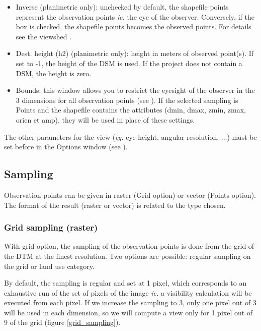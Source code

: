 \documentclass{report}
\begin{document}
\begin{itemize}
	\item Inverse (planimetric only): unchecked by default, the shapefile points represent the observation points \textit{ie.} the eye of the observer. Conversely, if the box is checked, the shapefile points becomes the observed points. For details see the viewshed .
	\item Dest. height (h2) (planimetric only): height in meters of observed point(s). If set to -1, the height of the DSM is used. If the project does not contain a DSM, the height is zero.
	\item Bounds: this window allows you to restrict the eyesight of the observer in the 3 dimensions for all observation points (see ). If the selected sampling is Points and the shapefile contains the attributes (dmin, dmax, zmin, zmax, orien et amp), they will be used in place of these settings.	
\end{itemize}

The other parameters for the view (\textit {eg.} eye height, angular resolution, ...) must be set before in the Options window (see ).


\subsection{Sampling}
\label{sampling}
Observation points can be given in raster (Grid option) or vector (Points option). The format of the result (raster or vector) is related to the type chosen.

\subsubsection{Grid sampling (raster)}
With grid option, the sampling of the observation points is done from the grid of the DTM at the finest resolution. Two options are possible: regular sampling on the grid or land use category.

By default, the sampling is regular and set at 1 pixel, which corresponds to an exhaustive run of the set of pixels of the image \textit{ie.} a visibility calculation will be executed from each pixel. If we increase the sampling to 3, only one pixel out of 3 will be used in each dimension, so we will compute a view only for 1 pixel out of 9 of the grid (figure \ref{grid_sampling}).
\end{document}
